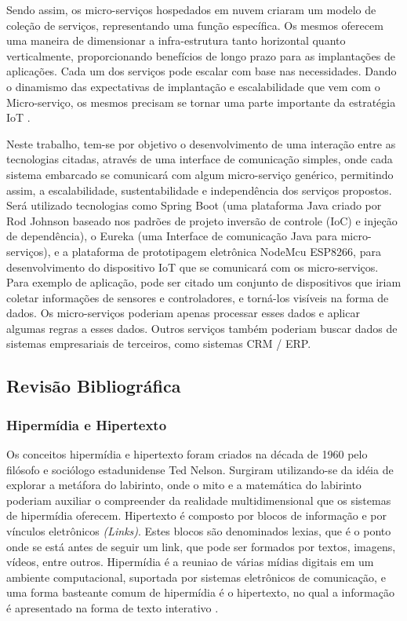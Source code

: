 \documentclass[journal]{IEEEtran}
\begin{document}
Sendo assim, os micro-serviços hospedados em nuvem criaram um modelo de coleção de serviços, representando uma função específica. Os mesmos oferecem uma maneira de dimensionar a infra-estrutura tanto horizontal quanto verticalmente, proporcionando benefícios de longo prazo para as implantações de aplicações. Cada um dos serviços pode escalar com base nas necessidades. Dando o dinamismo das expectativas de implantação e escalabilidade que vem com o Micro-serviço, os mesmos precisam se tornar uma parte importante da estratégia IoT \cite{manutayal2016}.

Neste trabalho, tem-se por objetivo o desenvolvimento de uma interação entre as tecnologias citadas, através de uma interface de comunicação simples, onde cada sistema embarcado se comunicará com algum micro-serviço genérico, permitindo assim, a escalabilidade, sustentabilidade e independência dos serviços propostos. Será utilizado tecnologias como Spring Boot (uma plataforma Java criado por Rod Johnson baseado nos padrões de projeto inversão de controle (IoC) e injeção de dependência), o Eureka (uma Interface de comunicação Java para micro-serviços), e a plataforma de prototipagem eletrônica NodeMcu ESP8266, para desenvolvimento do dispositivo IoT que se comunicará com os micro-serviços. Para exemplo de aplicação, pode ser citado  um conjunto de dispositivos que iriam coletar informações de sensores e controladores, e torná-los visíveis na forma de dados. Os micro-serviços poderiam apenas processar esses dados e aplicar algumas regras a esses dados. Outros serviços também poderiam buscar dados de sistemas empresariais de terceiros, como sistemas CRM / ERP.


\subsection{Revisão Bibliográfica}
\subsubsection{Hipermídia e Hipertexto}
Os conceitos hipermídia e hipertexto foram criados na década de 1960 pelo filósofo e sociólogo estadunidense Ted Nelson. Surgiram utilizando-se da idéia de explorar a metáfora do labirinto, onde o mito e a matemática do labirinto poderiam auxiliar o compreender da realidade multidimensional que os sistemas de hipermídia oferecem. Hipertexto é composto por blocos de informação e por vínculos eletrônicos \emph{(Links)}. Estes blocos são denominados lexias, que é o ponto onde se está antes de seguir um link, que pode ser formados por textos, imagens, vídeos, entre outros. Hipermídia é a reuniao de várias mídias digitais em um ambiente computacional, suportada por sistemas eletrônicos de comunicação, e uma forma basteante comum de hipermídia é o hipertexto, no qual a informação é apresentado na forma de texto interativo \cite{lillianhiper}.
\end{document}
